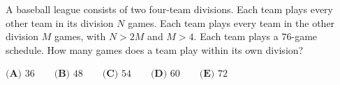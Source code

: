 A baseball league consists of two four-team divisions. Each team plays every other team in its division $N$ games. Each team plays every team in the other division $M$ games, with $N>2M$ and $M>4$. Each team plays a $76$-game schedule. How many games does a team play within its own division?

$\textbf{(A) }36\qquad\textbf{(B) }48\qquad\textbf{(C) }54\qquad\textbf{(D) }60\qquad\textbf{(E) }72$
